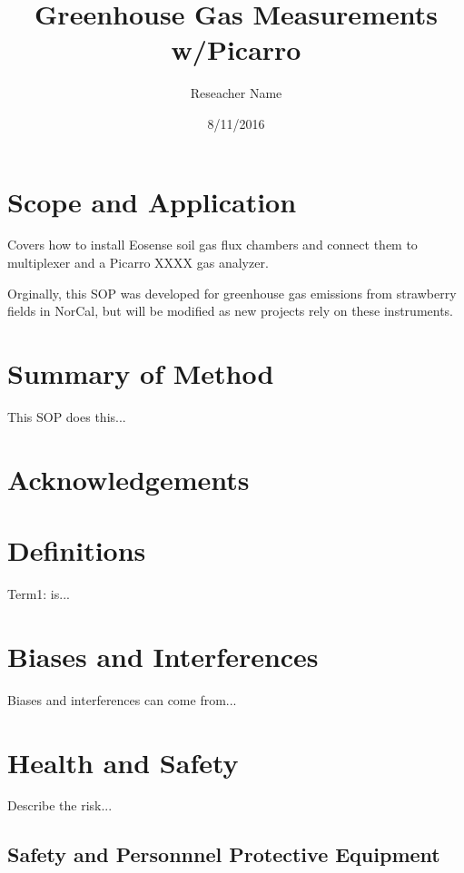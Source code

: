 \documentclass[12pt]{../SOP3_alpha}
\title{Greenhouse Gas Measurements w/Picarro}
\date{8/11/2016}
\author{Reseacher Name}
\begin{document}


\maketitle

\section{Scope and Application}

\NP Covers how to install Eosense soil gas flux chambers and connect them to multiplexer and a Picarro XXXX gas analyzer.

\NP Orginally, this SOP was developed for greenhouse gas emissions from strawberry fields in NorCal, but will be modified as new projects rely on these instruments. 

\section{Summary of Method}

\NP This SOP does this...

\tableofcontents

\newpage

\section{Acknowledgements}

\section{Definitions}

\NP Term1: is...

\section{Biases and Interferences}

\NP Biases and interferences can come from...

\section{Health and Safety}

\NP Describe the risk...


\subsection*{Safety and Personnnel Protective Equipment}
\end{document}
